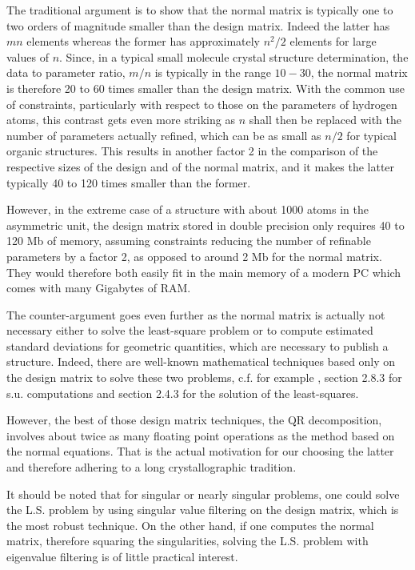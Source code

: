\documentclass[11pt]{article}
\begin{document}
The traditional argument is to show that the normal matrix is typically one to two orders of magnitude smaller than the design matrix. Indeed the latter has $m n$ elements whereas the former has approximately $n^2/2$ elements for large values of $n$. Since, in a typical small molecule crystal structure determination, the data to parameter ratio, $m / n$ is typically in the range $10-30$, the normal matrix is therefore 20 to 60 times smaller than the design matrix. With the common use of constraints, particularly with respect to those on the parameters of hydrogen atoms, this contrast gets even more striking as $n$ shall then be replaced with the number of parameters actually refined, which can be as small as $n/2$ for typical organic structures. This results in another factor 2 in the comparison of the respective sizes of the design and of the normal matrix, and it makes the latter typically 40 to 120 times smaller than the former. 

However, in the extreme case of a structure with about 1000 atoms in the asymmetric unit, the design matrix stored in double precision only requires 40 to 120 Mb of memory, assuming constraints reducing the number of refinable parameters by a factor 2, as opposed to around 2 Mb for the normal matrix. They would therefore both easily fit in the main memory of a modern PC which comes with many Gigabytes of RAM.

The counter-argument goes even further as the normal matrix is actually not necessary either to solve the least-square problem or to compute estimated standard deviations for geometric quantities, which are necessary to publish a structure. Indeed, there are well-known mathematical techniques based only on the design matrix to solve these two problems, c.f. for example , section 2.8.3 for s.u. computations and section 2.4.3 for the solution of the least-squares.
 
However, the best of those design matrix techniques, the QR decomposition, involves about twice as many floating point operations as the method based on the normal equations. That is the actual motivation for our choosing the latter and therefore adhering to a long crystallographic tradition.

It should be noted that for singular or nearly singular problems, one could solve the L.S. problem by using singular value filtering on the design matrix, which is the most robust technique. On the other hand, if one computes the normal matrix, therefore squaring the singularities, solving the L.S. problem with eigenvalue filtering is of little practical interest.
\end{document}

